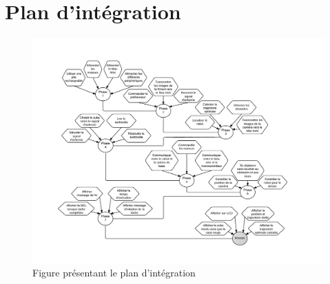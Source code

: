 


\chapter{Plan d'intégration}
\label{s:integration}
\begin{landscape}
\begin{figure}[htbp]
\centering
\label{fig:DiagrammeIntegration}
\includegraphics[scale=0.87]{fig/diagramme_integration.pdf}
\caption{Figure présentant le plan d'intégration}
\end{figure}
\end{landscape}